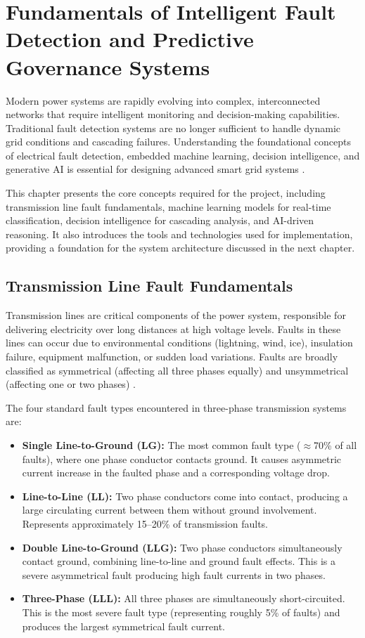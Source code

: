 \chapter{Fundamentals of Intelligent Fault Detection and Predictive Governance Systems}

Modern power systems are rapidly evolving into complex, interconnected networks that require intelligent monitoring and decision-making capabilities. Traditional fault detection systems are no longer sufficient to handle dynamic grid conditions and cascading failures. Understanding the foundational concepts of electrical fault detection, embedded machine learning, decision intelligence, and generative AI is essential for designing advanced smart grid systems \cite{EnergyInformatics2025}.

This chapter presents the core concepts required for the project, including transmission line fault fundamentals, machine learning models for real-time classification, decision intelligence for cascading analysis, and AI-driven reasoning. It also introduces the tools and technologies used for implementation, providing a foundation for the system architecture discussed in the next chapter.

\section{Transmission Line Fault Fundamentals}

Transmission lines are critical components of the power system, responsible for delivering electricity over long distances at high voltage levels. Faults in these lines can occur due to environmental conditions (lightning, wind, ice), insulation failure, equipment malfunction, or sudden load variations. Faults are broadly classified as symmetrical (affecting all three phases equally) and unsymmetrical (affecting one or two phases) \cite{Zhang2025}.

The four standard fault types encountered in three-phase transmission systems are:
\begin{itemize}
\setlength{\itemsep}{0pt}
\setlength{\parskip}{0pt}
\setlength{\parsep}{0pt}
\item \textbf{Single Line-to-Ground (LG):} The most common fault type ($\approx$70\% of all faults), where one phase conductor contacts ground. It causes asymmetric current increase in the faulted phase and a corresponding voltage drop.
\item \textbf{Line-to-Line (LL):} Two phase conductors come into contact, producing a large circulating current between them without ground involvement. Represents approximately 15--20\% of transmission faults.
\item \textbf{Double Line-to-Ground (LLG):} Two phase conductors simultaneously contact ground, combining line-to-line and ground fault effects. This is a severe asymmetrical fault producing high fault currents in two phases.
\item \textbf{Three-Phase (LLL):} All three phases are simultaneously short-circuited. This is the most severe fault type (representing roughly 5\% of faults) and produces the largest symmetrical fault current.
\end{itemize}

